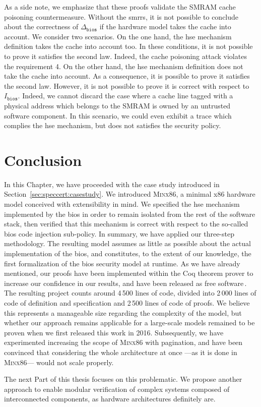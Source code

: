As a side note, we emphasize that these proofs validate the SMRAM cache
poisoning countermeasure.
%
Without the \acp{smrr}, it is not possible to conclude about the correctness of
\( \Delta_{\mathtt{bios}} \) if the hardware model takes the cache into account.
%
We consider two scenarios.
%
On the one hand, the \ac{hse} mechanism definition takes the cache into account
too.
%
In these conditions, it is not possible to prove it satisfies the second law.
%
Indeed, the cache poisoning attack violates the requirement 4.
%
On the other hand, the \ac{hse} mechanism definition does not take the cache
into account.
%
As a consequence, it is possible to prove it satisfies the second law.
%
However, it is not possible to prove it is correct with respect to
$I_{\mathtt{bios}}$.
%
Indeed, we cannot discard the case where a cache line tagged with a physical
address which belongs to the SMRAM is owned by an untrusted software component.
%
In this scenario, we could even exhibit a trace which complies the \ac{hse}
mechanism, but does not satisfies the security policy.

\section{Conclusion}
\label{sec:speccert:discuss}

In this Chapter, we have proceeded with the case study introduced in
Section~\ref{sec:speccert:casestudy}.
%
We introduced {\scshape Minx86}, a minimal x86 hardware model conceived with
extensibility in mind.
%
We specified the \ac{hse} mechanism implemented by the \ac{bios} in order to
remain isolated from the rest of the software stack, then verified that this
mechanism is correct with respect to the so-called \ac{bios} code injection
sub-policy.
%
In summary, we have applied our three-step methodology.
%
The resulting model assumes as little as possible about the actual
implementation of the \ac{bios}, and constitutes, to the extent of our
knowledge, the first formalization of the \ac{bios} security model at runtime.
%
As we have already mentioned, our proofs have been implemented within the Coq
theorem prover to increase our confidence in our results, and have been released
as free software\,\cite{letan2016speccertcode}.
%
The resulting project counts around 4\,500 lines of code, divided into 2\,000
lines of code of definition and specification and 2\,500 lines of code of
proofs.
%
We believe this represents a manageable size regarding the complexity of the
model, but whether our approach remains applicable for a large-scale models
remained to be proven when we first released this work in 2016.
%
Subsequently, we have experimented increasing the scope of {\scshape Minx86}
with pagination, and have been convinced that considering the whole architecture
at once ---as it is done in {\scshape Minx86}--- would not scale properly.

The next Part of this thesis focuses on this problematic.
%
We propose another approach to enable modular verification of complex systems
composed of interconnected components, as hardware architectures definitely are.
